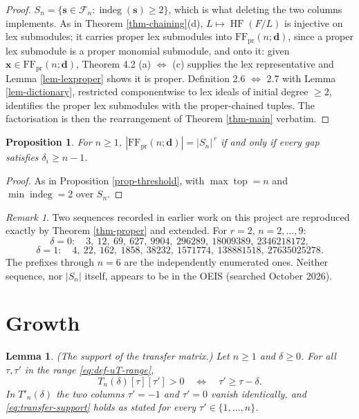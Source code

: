 \documentclass[11pt, a4paper, abstract=yes]{scrartcl}
\theoremstyle{definition}
\theoremstyle{remark}
\newtheorem{remark}[definition]{Remark}
\theoremstyle{plain}
\newtheorem{lemma}[definition]{Lemma}
\newtheorem{proposition}[definition]{Proposition}
\newcommand{\vek}[1]{\boldsymbol{#1}}
\newcommand{\indeg}{\operatorname{indeg}}
\newcommand{\tp}{\operatorname{top}}
\newcommand{\HF}{\operatorname{HF}}
\begin{document}
\begin{proof}
\(S_n=\lbrace \vek s\in\mathcal F_n:\indeg(\vek s)\ge2\rbrace\), which is what deleting the two columns
implements. As in Theorem \ref{thm-chaining}(d), \(L\mapsto\HF(F/L)\) is injective on lex submodules; it
carries proper lex submodules into \(\mathrm{FF}_{\mathrm{pr}}(n;\vek d)\), since a proper lex submodule is a
proper monomial submodule, and onto it: given \(\vek x\in\mathrm{FF}_{\mathrm{pr}}(n;\vek d)\), Theorem 4.2
(a) \(\Leftrightarrow\) (c) supplies the lex representative and Lemma \ref{lem-lexproper} shows it is
proper. Definition 2.6 \(\Leftrightarrow\) 2.7 with Lemma \ref{lem-dictionary}, restricted componentwise
to lex ideals of initial degree \(\ge2\), identifies the proper lex submodules with the proper-chained
tuples. The factorisation is then the rearrangement of Theorem \ref{thm-main} verbatim.
\end{proof}

\begin{proposition}
For \(n\ge1\), \(|\mathrm{FF}_{\mathrm{pr}}(n;\vek d)|=|S_n|^{\,r}\) if and only if every gap satisfies
\(\delta_i\ge n-1\).
\label{prop-proper-threshold}
\end{proposition}

\begin{proof}
As in Proposition \ref{prop-threshold}, with \(\max\tp=n\) and \(\min\indeg=2\) over \(S_n\).
\end{proof}

\begin{remark}
Two sequences recorded in earlier work on this project are reproduced exactly by
Theorem \ref{thm-proper} and extended. For \(r=2\), \(n=2,\dots,9\):
\begin{equation}\label{eq:auto-17}
  \delta=0:\quad 3,\ 12,\ 69,\ 627,\ 9904,\ 296289,\ 18009389,\ 2346218172,
\end{equation}
\begin{equation}\label{eq:auto-18}
  \delta=1:\quad 4,\ 22,\ 162,\ 1858,\ 38232,\ 1571774,\ 138881518,\ 27635025278 .
\end{equation}
The prefixes through \(n=6\) are the independently enumerated ones. Neither sequence, nor \(|S_n|\)
itself, appears to be in the OEIS (searched October 2026).
\label{rem-proper-sequences}
\end{remark}
\section{Growth}
\label{sec-growth}
\begin{lemma}
(\emph{The support of the transfer matrix.}) Let \(n\ge1\) and \(\delta\ge0\). For all \(\tau,\tau'\) in
the range \eqref{eq:def-uT-range},
\begin{equation}\label{eq:transfer-support}
  T_n(\delta)[\tau][\tau']>0\quad\Longleftrightarrow\quad\tau'\ge\tau-\delta .
\end{equation}
In \(T'_n(\delta)\) the two columns \(\tau'=-1\) and \(\tau'=0\) vanish identically, and
\eqref{eq:transfer-support} holds as stated for every \(\tau'\in\lbrace1,\dots,n\rbrace\).
\label{lem-transfer-support}
\end{lemma}
\end{document}
